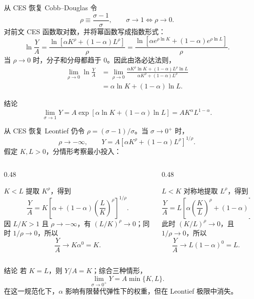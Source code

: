 \documentclass[aspectratio=32]{beamer}
\begin{document}
\begin{frame}{从 CES 恢复 Cobb--Douglas}
\small
\setlength{\abovedisplayskip}{3pt}
\setlength{\belowdisplayskip}{3pt}
令
\[
\rho\equiv\frac{\sigma-1}{\sigma},\qquad
\sigma\to1\Longleftrightarrow\rho\to0.
\]
对前文 CES 函数取对数，并将幂函数写成指数形式：
\[
\ln\frac{Y}{A}
=\frac{\ln\!\left[\alpha K^\rho+(1-\alpha)L^\rho\right]}{\rho}
=\frac{\ln\!\left[\alpha e^{\rho\ln K}
 +(1-\alpha)e^{\rho\ln L}\right]}{\rho}.
\]
当 $\rho\to0$ 时，分子和分母都趋于 $0$。因此由洛必达法则，
\[
\begin{aligned}
\lim_{\rho\to0}\ln\frac{Y}{A}
&=\lim_{\rho\to0}
\frac{\alpha K^\rho\ln K+(1-\alpha)L^\rho\ln L}
     {\alpha K^\rho+(1-\alpha)L^\rho}\\
&=\alpha\ln K+(1-\alpha)\ln L.
\end{aligned}
\]
\begin{alertblock}{结论}
\[
\lim_{\sigma\to1}Y
=A\exp{\left[\alpha\ln K+(1-\alpha)\ln L\right]}
=AK^\alpha L^{1-\alpha}.
\]
\end{alertblock}
\end{frame}

\begin{frame}{从 CES 恢复 Leontief}
\footnotesize
\setlength{\abovedisplayskip}{1.5pt}
\setlength{\belowdisplayskip}{1.5pt}
仍令 $\rho=(\sigma-1)/\sigma$。当 $\sigma\to0^+$ 时，
\[
\rho\to-\infty,\qquad
Y=A\left[\alpha K^\rho+(1-\alpha)L^\rho\right]^{1/\rho}.
\]
假定 $K,L>0$，分情形考察最小投入：
\vspace{-0.08cm}
\begin{columns}[T]
\begin{column}{0.48\textwidth}
\begin{block}{$K<L$}
\scriptsize
提取 $K^\rho$，得到
\[
\frac{Y}{A}=K\left[\alpha+(1-\alpha)
\left(\frac{L}{K}\right)^\rho\right]^{1/\rho}.
\]
因 $L/K>1$ 且 $\rho\to-\infty$，有
$(L/K)^\rho\to0$；同时 $1/\rho\to0$，所以
\[
\frac{Y}{A}\to K\alpha^0=K.
\]
\end{block}
\end{column}
\begin{column}{0.48\textwidth}
\begin{block}{$L<K$}
\scriptsize
对称地提取 $L^\rho$，得到
\[
\frac{Y}{A}
=L\left[\alpha\left(\frac{K}{L}\right)^\rho
 +(1-\alpha)\right]^{1/\rho}.
\]
此时 $(K/L)^\rho\to0$，且 $1/\rho\to0$，所以
\[
\frac{Y}{A}\to L(1-\alpha)^0=L.
\]
\end{block}
\end{column}
\end{columns}
\vspace{-0.15cm}
\begin{alertblock}{结论}
\scriptsize
若 $K=L$，则 $Y/A=K$；综合三种情形，
\[
\lim_{\sigma\to0^+}Y=A\min\{K,L\}.
\]
在这一规范化下，$\alpha$ 影响有限替代弹性下的权重，但在 Leontief 极限中消失。
\end{alertblock}
\end{frame}
\end{document}
